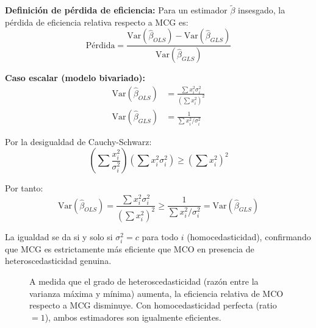 \documentclass[12pt,a4paper]{report}
\theoremstyle{definition}
\theoremstyle{remark}
\newcommand{\Var}{\mathrm{Var}}
\newcommand{\betahat}{\hat{\beta}}
\begin{document}
\textbf{Definición de pérdida de eficiencia:} Para un estimador $\tilde{\beta}$ insesgado, la pérdida de eficiencia relativa respecto a MCG es:
\begin{equation}
  \text{Pérdida} = \frac{\Var(\betahat_{OLS}) - \Var(\betahat_{GLS})}{\Var(\betahat_{GLS})} \tag{A.4}
\end{equation}

\textbf{Caso escalar (modelo bivariado):}
\begin{align*}
  \Var(\betahat_{OLS}) &= \frac{\sum x_i^2 \sigma_i^2}{(\sum x_i^2)^2}\\
  \Var(\betahat_{GLS}) &= \frac{1}{\sum x_i^2/\sigma_i^2}
\end{align*}

Por la desigualdad de Cauchy-Schwarz:
\begin{equation*}
  \left(\sum \frac{x_i^2}{\sigma_i^2}\right)\left(\sum x_i^2 \sigma_i^2\right) \geq \left(\sum x_i^2\right)^2
\end{equation*}

Por tanto:
\begin{equation}
  \Var(\betahat_{OLS}) = \frac{\sum x_i^2 \sigma_i^2}{(\sum x_i^2)^2} \geq \frac{1}{\sum x_i^2/\sigma_i^2} = \Var(\betahat_{GLS}) \tag{A.5}
\end{equation}

La igualdad se da si y solo si $\sigma_i^2 = c$ para todo $i$ (homocedasticidad), confirmando que MCG es estrictamente más eficiente que MCO en presencia de heteroscedasticidad genuina.

\begin{figure}[H]
  \centering
  \caption{A medida que el grado de heteroscedasticidad (razón entre la varianza máxima y mínima) aumenta, la eficiencia relativa de MCO respecto a MCG disminuye. Con homocedasticidad perfecta (ratio $= 1$), ambos estimadores son igualmente eficientes.}
  \label{fig:eficiencia}
\end{figure}
\end{document}

